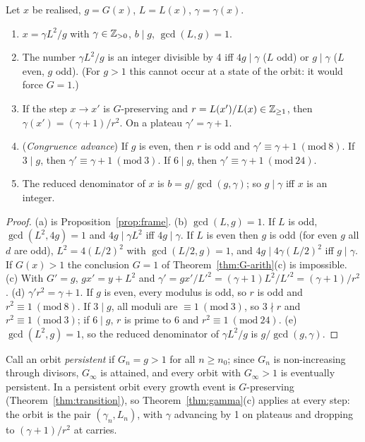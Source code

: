 \begin{theorem}\label{thm:gamma}
Let \(x\) be realised, \(g=G(x)\), \(L=L(x)\), \(\gamma=\gamma(x)\).
\begin{enumerate}[label=(\alph*),nosep]
\item \(x=\gamma L^2/g\) with \(\gamma\in\mathbb{Z}_{>0}\), \(b\mid g\), \(\gcd(L,g)=1\).
\item The number \(\gamma L^2/g\) is an integer divisible by 4 iff \(4g\mid\gamma\) (\(L\) odd) or \(g\mid\gamma\) (\(L\) even, \(g\) odd). (For \(g>1\) this cannot occur at a state of the orbit: it would force \(G=1\).)
\item If the step \(x\to x'\) is \(G\)-preserving and \(r=L(x')/L(x)\in\mathbb{Z}_{\ge1}\), then \(\gamma(x')=(\gamma+1)/r^2\). On a plateau \(\gamma'=\gamma+1\).
\item (\emph{Congruence advance}) If \(g\) is even, then \(r\) is odd and \(\gamma'\equiv\gamma+1\ (\mathrm{mod}\ 8)\). If \(3\mid g\), then \(\gamma'\equiv\gamma+1\ (\mathrm{mod}\ 3)\). If \(6\mid g\), then \(\gamma'\equiv\gamma+1\ (\mathrm{mod}\ 24)\).
\item The reduced denominator of \(x\) is \(b=g/\gcd(g,\gamma)\); so \(g\mid\gamma\) iff \(x\) is an integer.
\end{enumerate}
\end{theorem}
\begin{proof}
(a) is Proposition~\ref{prop:frame}. (b) \(\gcd(L,g)=1\). If \(L\) is odd, \(\gcd(L^2,4g)=1\) and \(4g\mid\gamma L^2\) iff \(4g\mid\gamma\). If \(L\) is even then \(g\) is odd (for even \(g\) all \(d\) are odd), \(L^2=4(L/2)^2\) with \(\gcd(L/2,g)=1\), and \(4g\mid4\gamma(L/2)^2\) iff \(g\mid\gamma\). If \(G(x)>1\) the conclusion \(G=1\) of Theorem~\ref{thm:G-arith}(c) is impossible. (c) With \(G'=g\), \(gx'=y+L^2\) and \(\gamma'=gx'/L'^2=(\gamma+1)L^2/L'^2=(\gamma+1)/r^2\). (d) \(\gamma'r^2=\gamma+1\). If \(g\) is even, every modulus is odd, so \(r\) is odd and \(r^2\equiv1\ (\mathrm{mod}\ 8)\). If \(3\mid g\), all moduli are \(\equiv1\ (\mathrm{mod}\ 3)\), so \(3\nmid r\) and \(r^2\equiv1\ (\mathrm{mod}\ 3)\); if \(6\mid g\), \(r\) is prime to 6 and \(r^2\equiv1\ (\mathrm{mod}\ 24)\). (e) \(\gcd(L^2,g)=1\), so the reduced denominator of \(\gamma L^2/g\) is \(g/\gcd(g,\gamma)\).
\end{proof}

Call an orbit \emph{persistent} if \(G_n=g>1\) for all \(n\ge n_0\); since \(G_n\) is non-increasing through divisors, \(G_\infty\) is attained, and every orbit with \(G_\infty>1\) is eventually persistent. In a persistent orbit every growth event is \(G\)-preserving (Theorem~\ref{thm:transition}), so Theorem~\ref{thm:gamma}(c) applies at every step: the orbit is the pair \((\gamma_n,L_n)\), with \(\gamma\) advancing by 1 on plateaus and dropping to \((\gamma+1)/r^2\) at carries.

